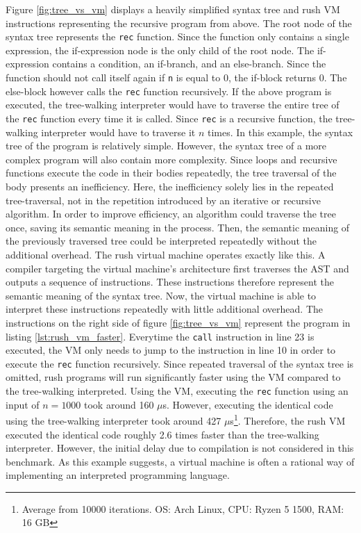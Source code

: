 Figure \ref{fig:tree_vs_vm} displays a heavily simplified syntax tree and rush VM instructions representing the recursive program from above.
The root node of the syntax tree represents the \texttt{rec} function.
Since the function only contains a single expression, the if-expression node is the only child of the root node.
The if-expression contains a condition, an if-branch, and an else-branch.
Since the function should not call itself again if \texttt{n} is equal to 0, the if-block returns 0.
The else-block however calls the \texttt{rec} function recursively.
If the above program is executed, the tree-walking interpreter would have to traverse the entire tree of the \texttt{rec} function every time it is called.
Since \texttt{rec} is a recursive function, the tree-walking interpreter would have to traverse it $n$ times.
In this example, the syntax tree of the program is relatively simple.
However, the syntax tree of a more complex program will also contain more complexity.
Since loops and recursive functions execute the code in their bodies repeatedly, the tree traversal of the body presents an inefficiency.
Here, the inefficiency solely lies in the repeated tree-traversal, not in the repetition introduced by an iterative or recursive algorithm.
In order to improve efficiency, an algorithm could traverse the tree once, saving its semantic meaning in the process.
Then, the semantic meaning of the previously traversed tree could be interpreted repeatedly without the additional overhead.
The rush virtual machine operates exactly like this.
A compiler targeting the virtual machine's architecture first traverses the AST and outputs a sequence of instructions.
These instructions therefore represent the semantic meaning of the syntax tree.
Now, the virtual machine is able to interpret these instructions repeatedly with little additional overhead.
The instructions on the right side of figure \ref{fig:tree_vs_vm} represent the program in listing \ref{lst:rush_vm_faster}.
Everytime the \texttt{call} instruction in line 23 is executed, the VM only needs to jump to the instruction in line 10 in order to execute the \texttt{rec} function recursively.
Since repeated traversal of the syntax tree is omitted, rush programs will run significantly faster using the VM compared to the tree-walking interpreted.
Using the VM, executing the \texttt{rec} function using an input of $n = 1000$ took around 160 $\mu$s.
However, executing the identical code using the tree-walking interpreter took around 427 $\mu$s\footnote{Average from 10000 iterations. OS: Arch Linux, CPU: Ryzen 5 1500, RAM: 16 GB}.
Therefore, the rush VM executed the identical code roughly 2.6 times faster than the tree-walking interpreter.
However, the initial delay due to compilation is not considered in this benchmark.
As this example suggests, a virtual machine is often a rational way of implementing an interpreted programming language.


